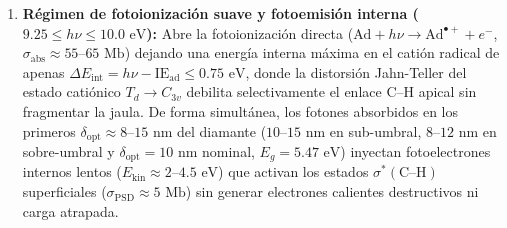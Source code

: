 \documentclass[10pt,twocolumn,a4paper]{article}
\begin{document}
\begin{enumerate}
    \item \textbf{Régimen de fotoionización suave y fotoemisión interna ($9.25 \le h\nu \le 10.0\text{ eV}$):} Abre la fotoionización directa ($\text{Ad} + h\nu \to \text{Ad}^{\bullet+} + e^-$, $\sigma_{\text{abs}} \approx 55\text{--}65\text{ Mb}$) dejando una energía interna máxima en el catión radical de apenas $\Delta E_{\text{int}} = h\nu - \text{IE}_{\text{ad}} \le 0.75\text{ eV}$, donde la distorsión Jahn-Teller del estado catiónico $T_d \to C_{3v}$ debilita selectivamente el enlace $\text{C--H}$ apical sin fragmentar la jaula. De forma simultánea, los fotones absorbidos en los primeros $\delta_{\text{opt}} \approx 8\text{--}15\text{ nm}$ del diamante ($10\text{--}15\text{ nm}$ en sub-umbral, $8\text{--}12\text{ nm}$ en sobre-umbral y $\delta_{\text{opt}} = 10\text{ nm}$ nominal, $E_g = 5.47\text{ eV}$) inyectan fotoelectrones internos lentos ($E_{\text{kin}} \approx 2\text{--}4.5\text{ eV}$) que activan los estados $\sigma^*(\text{C--H})$ superficiales ($\sigma_{\text{PSD}} \approx 5\text{ Mb}$) sin generar electrones calientes destructivos ni carga atrapada.
\end{enumerate}
\end{document}
